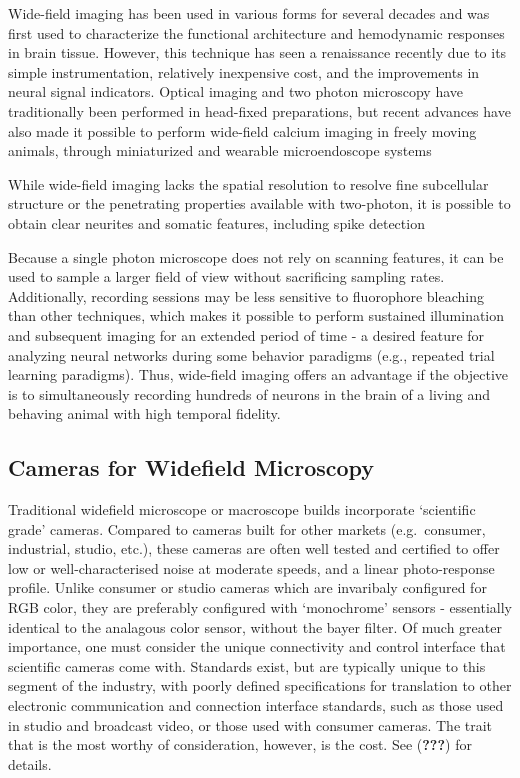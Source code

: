 \documentclass[
  12pt,
]{report}
\numberwithin{figure}{section}
\numberwithin{table}{section}
\numberwithin{equations}{section}
\begin{document}
Wide-field imaging has been used in various forms for several decades
and was first used to characterize the functional architecture and
hemodynamic responses in brain tissue. However, this technique has seen
a renaissance recently due to its simple instrumentation, relatively
inexpensive cost, and the improvements in neural signal indicators.
Optical imaging and two photon microscopy have traditionally been
performed in head-fixed preparations, but recent advances have also made
it possible to perform wide-field calcium imaging in freely moving
animals, through miniaturized and wearable microendoscope systems

While wide-field imaging lacks the spatial resolution to resolve fine
subcellular structure or the penetrating properties available with
two-photon, it is possible to obtain clear neurites and somatic
features, including spike detection

Because a single photon microscope does not rely on scanning features,
it can be used to sample a larger field of view without sacrificing
sampling rates. Additionally, recording sessions may be less sensitive
to fluorophore bleaching than other techniques, which makes it possible
to perform sustained illumination and subsequent imaging for an extended
period of time - a desired feature for analyzing neural networks during
some behavior paradigms (e.g., repeated trial learning paradigms). Thus,
wide-field imaging offers an advantage if the objective is to
simultaneously recording hundreds of neurons in the brain of a living
and behaving animal with high temporal fidelity.

\hypertarget{cameras-for-widefield-microscopy}{%
\subsection{Cameras for Widefield
Microscopy}\label{cameras-for-widefield-microscopy}}

Traditional widefield microscope or macroscope builds incorporate
`scientific grade' cameras. Compared to cameras built for other markets
(e.g.~consumer, industrial, studio, etc.), these cameras are often well
tested and certified to offer low or well-characterised noise at
moderate speeds, and a linear photo-response profile. Unlike consumer or
studio cameras which are invaribaly configured for RGB color, they are
preferably configured with `monochrome' sensors - essentially identical
to the analagous color sensor, without the bayer filter. Of much greater
importance, one must consider the unique connectivity and control
interface that scientific cameras come with. Standards exist, but are
typically unique to this segment of the industry, with poorly defined
specifications for translation to other electronic communication and
connection interface standards, such as those used in studio and
broadcast video, or those used with consumer cameras. The trait that is
the most worthy of consideration, however, is the cost. See
({\textbf{???}}) for details.
\end{document}
